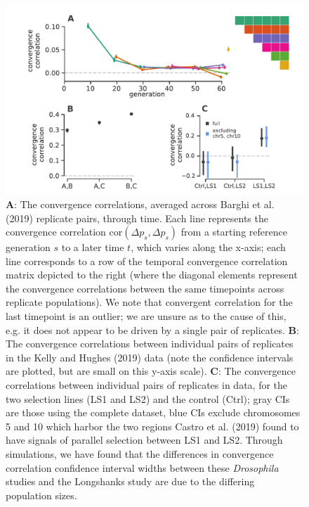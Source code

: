 \documentclass[9pt,twocolumn,twoside]{pnas-new}
\begin{document}
\begin{figure}
  \centering
  \includegraphics[width=15cm]{figure-2-pnas.pdf}

  \caption{{\bf A}: The convergence correlations, averaged across
    Barghi et al. (2019) replicate pairs, through time. Each line
    represents the convergence correlation $\mathrm{cor}(\Delta p_{s}, \Delta
    p_{s})$ from a starting reference generation $s$ to a later time $t$, which
    varies along the x-axis; each line corresponds to a row of the temporal
    convergence correlation matrix depicted to the right (where the
      diagonal elements represent the convergence correlations between the same
      timepoints across replicate populations). We note that convergent
      correlation for the last timepoint is an outlier; we are unsure as to the
      cause of this, e.g. it does not appear to be driven by a single pair of
      replicates. {\bf B}: The convergence correlations between individual
      pairs of replicates in the Kelly and Hughes (2019) data (note the
      confidence intervals are plotted, but are small on this y-axis scale).
      {\bf C}:  The convergence correlations between individual pairs of
      replicates in \cite{Castro2019-uk} data, for the two selection lines
      (LS1 and LS2) and the control (Ctrl); gray CIs are those using the
      complete dataset, blue CIs exclude chromosomes 5 and 10 which harbor the
      two regions Castro et al. (2019) found to have signals of parallel
      selection between LS1 and LS2. Through simulations, we have found
        that the differences in convergence correlation confidence interval
        widths between these \emph{Drosophila} studies and the Longshanks study
        are due to the differing population sizes.}

  \label{fig:figure-2}
\end{figure}
\end{document}
